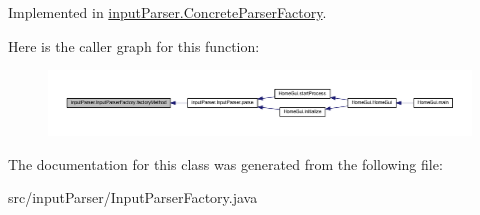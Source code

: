 Implemented in \hyperlink{classinput_parser_1_1_concrete_parser_factory_a6fdfbfef9e48417903f60faf67640d1e}{input\-Parser.\-Concrete\-Parser\-Factory}.



Here is the caller graph for this function\-:\nopagebreak
\begin{figure}[H]
\begin{center}
\leavevmode
\includegraphics[width=350pt]{classinput_parser_1_1_input_parser_factory_a48971c2679b589f34a7051e795d48c49_icgraph}
\end{center}
\end{figure}




The documentation for this class was generated from the following file\-:\begin{DoxyCompactItemize}
\item 
src/input\-Parser/Input\-Parser\-Factory.\-java\end{DoxyCompactItemize}
